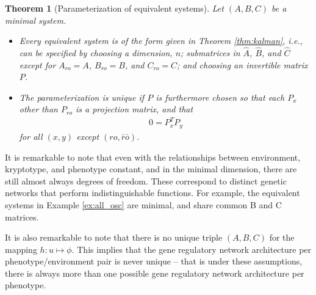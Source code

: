 \documentclass{article}
\newcommand{\plr}[1]{\todo[color=blue!25]{#1}}
\newcommand{\plr}[1]{{\color{blue}\it #1}}
\newcommand{\ro}{{ro}}
\newcommand{\nrno}{{\bar{r}\bar{o}}}
\newcommand{\calA}{\mathcal{A}}
\newcommand{\1}{\mathbbm{1}}
\newcommand{\Sys}{\mathcal{S}}
\newcommand{\allS}{\mathcal{A}}
\newtheorem{theorem}{Theorem}
\begin{document}
\begin{theorem}[Parameterization of equivalent systems]
    Let $(A,B,C)$ be a minimal system.
    \begin{itemize}
        \item[(a)]
            Every equivalent system is of the form given in Theorem \ref{thm:kalman},
            i.e., can be specified by choosing a dimension, $n$;
            submatrices in $\widehat A$, $\widehat B$, and $\widehat C$ 
            except for $A_\ro=A$, $B_\ro=B$, and $C_\ro=C$;
            and choosing an invertible matrix $P$.

        \item[(b)]
            \plr{conjecture:}
            The parameterization is unique
            if $P$ is furthermore chosen so that 
            each $P_x$ other than $P_\ro$ is a projection matrix,
            and that 
            \begin{align*}
                0
                =
                P_x^T P_y
            \end{align*}
            for all $(x,y)$ except $(\ro,\nrno)$.

    \end{itemize} 
\end{theorem}

It is remarkable to note that even with the relationships between environment, kryptotype, and phenotype constant, and in the minimal dimension, there are still almost always degrees of freedom. These correspond to distinct genetic networks that perform indistinguishable functions. For example, the equivalent systems in Example \ref{ex:all_osc} are minimal, and share common B and C matrices.

It is also remarkable to note that there is no unique triple $(A,B,C)$ for the mapping $h: u \mapsto \phi$. This implies that the gene regulatory network architecture per phenotype/environment pair is never unique -- that is under these assumptions, there is always more than one possible gene regulatory network architecture per phenotype. 
\end{document}
